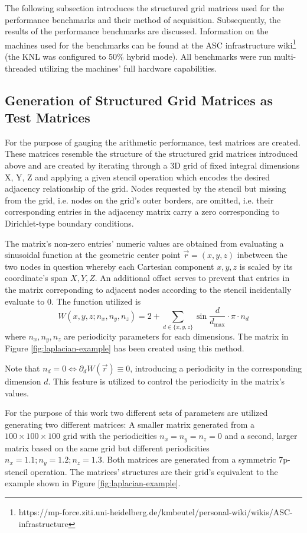 \documentclass{article}
\begin{document}
  The following subsection introduces the structured grid matrices used for the performance benchmarks and their method of acquisition. Subsequently, the results of the performance benchmarks are discussed. Information on the machines used for the benchmarks can be found at the ASC infrastructure wiki\footnote{https://mp-force.ziti.uni-heidelberg.de/kmbeutel/personal-wiki/wikis/ASC-infrastructure} (the KNL was configured to 50\% hybrid mode). All benchmarks were run multi-threaded utilizing the machines' full hardware capabilities.

  \subsection{Generation of Structured Grid Matrices as Test Matrices}

    For the purpose of gauging the arithmetic performance, test matrices are created. These matrices resemble the structure of the structured grid matrices introduced above and are created by iterating through a 3D grid of fixed integral dimensions X, Y, Z and applying a given stencil operation which encodes the desired adjacency relationship of the grid. Nodes requested by the stencil but missing from the grid, i.e. nodes on the grid's outer borders, are omitted, i.e. their corresponding entries in the adjacency matrix carry a zero corresponding to Dirichlet-type boundary conditions.

    The matrix's non-zero entries' numeric values are obtained from evaluating a sinusoidal function at the geometric center point $\vec{r} = (x, y, z)$ inbetween the two nodes in question whereby each Cartesian component $x, y, z$ is scaled by its coordinate's span $X, Y, Z$. An additional offset serves to prevent that entries in the matrix correponding to adjacent nodes according to the stencil incidentally evaluate to 0. The function utilized is $$W(x,y,z; n_x, n_y, n_z) = 2 + \sum \limits_{d \in \{x,y,z\}} \sin{\frac{d}{d_{\text{max}}} \cdot \pi \cdot n_d} $$ where $n_x, n_y, n_z$ are periodicity parameters for each dimensions. The matrix in Figure \ref{fig:laplacian-example} has been created using this method.

    Note that $n_d = 0 \Leftrightarrow \partial_d W(\vec{r}) \equiv 0$, introducing a periodicity in the corresponding dimension $d$. This feature is utilized to control the periodicity in the matrix's values.

    For the purpose of this work two different sets of parameters are utilized generating two different matrices: A smaller matrix generated from a $100 \times 100 \times 100$ grid with the periodicities $n_x = n_y = n_z = 0$ and a second, larger matrix based on the same grid but different periodicities $n_x = 1.1; n_y = 1.2; n_z = 1.3$. Both matrices are generated from a symmetric 7p-stencil operation. The matrices' structures are their grid's equivalent to the example shown in Figure \ref{fig:laplacian-example}.
\end{document}

